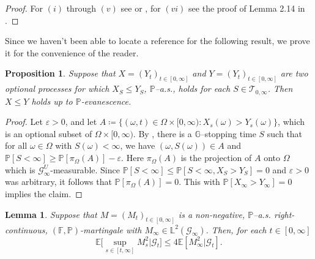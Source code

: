 \documentclass[10pt]{article} %
\newtheorem{lemma}[theorem]{Lemma}
\newtheorem{proposition}[theorem]{Proposition}
\newcommand\cG{\mathcal G}
\newcommand\cT{\mathcal T}
\def \E{\mathbb{E}}
\def \F{\mathbb{F}}
\def \G{\mathbb{G}}
\def \L{\mathbb{L}}
\def \P{\mathbb{P}}
\begin{document}
\begin{proof}
	For $(i)$ through $(v)$ see \cite[page 119--120]{dellacherie1982probabilities} or \cite[page 21--22]{he1992semimartingale}, for $(vi)$ see the proof of Lemma 2.14 in \cite{papapantoleon2018existence}.
\end{proof}

Since we haven't been able to locate a reference for the following result, we prove it for the convenience of the reader.

\begin{proposition}\label{prop::optional_ineq}
	Suppose that $X = (Y_t)_{t \in [0,\infty]}$ and $Y = (Y_t)_{t \in [0,\infty]}$ are two optional processes for which $X_S \leq Y_S$, $\P${\rm--a.s.}, holds for each $S \in \cT_{0,\infty}$. Then $X \leq Y$ holds up to $\P$-evanescence.
\end{proposition}

\begin{proof}
	Let $\varepsilon > 0$, and let $A \coloneqq \{(\omega,t) \in \Omega \times [0,\infty) : X_s(\omega) > Y_s(\omega) \}$, which is an optional subset of $\Omega \times [0,\infty)$. By \cite[Theorem IV.84]{ dellacherie1978probabilities}, there is a $\G$--stopping time $S$ such that for all $\omega \in \Omega$ with $S(\omega) < \infty$, we have $(\omega,S(\omega)) \in A $ and $\P[S < \infty] \geq \P[\pi_\Omega(A)] - \varepsilon.$ Here $\pi_\Omega(A)$ is the projection of $A$ onto $\Omega$ which is $\cG^U_\infty$-measurable. Since $\P[S < \infty] \leq \P[S < \infty, X_S > Y_S] = 0$ and $\varepsilon > 0$ was arbitrary, it follows that $\P[\pi_\Omega(A)] = 0$. This with $\P[X_\infty > Y_\infty] = 0$ implies the claim.
\end{proof}


\begin{lemma}\label{lem::cond_doob}
	Suppose that $M = (M_t)_{t \in [0,\infty]}$ is a non-negative, $\P${\rm--a.s.} right-continuous, $(\F,\P)$-martingale with $M_\infty \in \L^2(\cG_\infty)$. Then, for each $t \in [0,\infty]$
	\begin{equation*}
		\E \bigg[ \sup_{s \in [t,\infty]} M^2_s \bigg| \cG_t \bigg] \leq 4 \E[ M^2_\infty | \cG_t ].
	\end{equation*}
\end{lemma}
\end{document}
